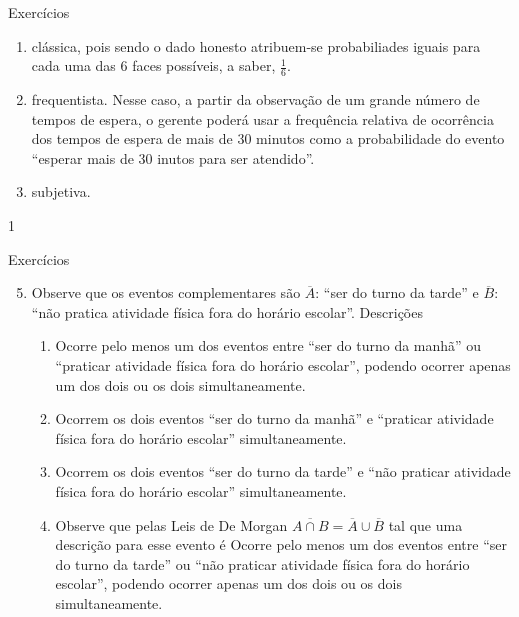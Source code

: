 \begin{answer}{Exercícios}
{\begin{enumerate}
\begin{enumerate}
\item clássica, pois sendo o dado honesto atribuem-se probabiliades iguais para cada uma das $6$ faces possíveis, a saber, $\frac{1}{6}$.
\item frequentista. Nesse caso, a partir da observação de um grande número de tempos de espera, o gerente poderá usar a frequência relativa de ocorrência dos tempos de espera de mais de 30 minutos como a probabilidade do evento “esperar mais de $30$ inutos para ser atendido”.
\item subjetiva.
\end{enumerate}
\end{enumerate}
}{1}
\end{answer}
\clearmargin

\begin{answer}{Exercícios}
{\exerciselist
\begin{enumerate}\setcounter{enumi}{4}
\item Observe que os eventos complementares são $\overline{A}$: “ser do turno da tarde” e $\overline{B}$: “não pratica atividade física fora do horário escolar”. Descrições

\begin{enumerate}
\item Ocorre pelo menos um dos eventos entre “ser do turno da manhã” ou “praticar atividade física fora do horário escolar”, podendo ocorrer apenas um dos dois ou os dois simultaneamente.
\item Ocorrem os dois eventos “ser do turno da manhã” e “praticar atividade física fora do horário escolar” simultaneamente.
\item Ocorrem os dois eventos “ser do turno da tarde” e “não praticar atividade física fora do horário escolar” simultaneamente.
\item Observe que pelas Leis de De Morgan $\overline{A\cap B}=\overline{A}\cup \overline{B}$ tal que uma descrição para esse evento é Ocorre pelo menos um dos eventos entre “ser do turno da tarde” ou “não praticar atividade física fora do horário escolar”, podendo ocorrer apenas um dos dois ou os dois simultaneamente.
\end{enumerate}


\end{enumerate}}
\end{answer}
